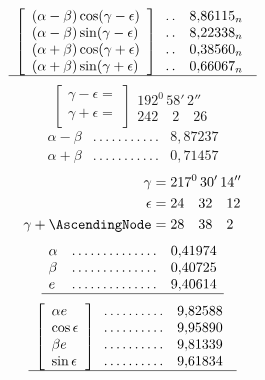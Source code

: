 \[
\begin{array}{c}
\left[\begin{array}{l}
(\alpha-\beta)\cos(\gamma-\epsilon)\\
(\alpha-\beta)\sin(\gamma-\epsilon)\\
(\alpha+\beta)\cos(\gamma+\epsilon)\\
(\alpha+\beta)\sin(\gamma+\epsilon)
\end{array}\right]
\begin{array}{cl}
.\,.&8{,}86115_n\\.\,.&8{,}22338_n\\.\,.&0{,}38560_n\\.\,.&0{,}66067_n
\end{array}\\
\hline
\end{array}
\]
\[
\left[\begin{array}{l}\gamma-\epsilon=\\\gamma+\epsilon=\end{array}\right]
\begin{array}{l}192^0\,58'\,2''\\242\quad2\quad26\end{array}
\]
\[
\begin{array}{lcl}
\alpha-\beta&.\,.\,.\,.\,.\,.\,.\,.\,.\,.\,.&8{,}87237\\
\alpha+\beta&.\,.\,.\,.\,.\,.\,.\,.\,.\,.\,.&0{,}71457
\end{array}
\]
\[
\begin{aligned}
\gamma&=217^0\,30'\,14''\\
\epsilon&=24\quad32\quad12\\
\gamma+\AscendingNode&=28\quad38\quad2
\end{aligned}
\]
\[
\begin{array}{lcl}
\alpha&.\,.\,.\,.\,.\,.\,.\,.\,.\,.\,.\,.\,.\,.&0{,}41974\\
\beta&.\,.\,.\,.\,.\,.\,.\,.\,.\,.\,.\,.\,.\,.&0{,}40725\\
e&.\,.\,.\,.\,.\,.\,.\,.\,.\,.\,.\,.\,.\,.&9{,}40614\\
\hline
\end{array}
\]
\[
\begin{array}{c}
\left[\begin{array}{l}
\alpha e\\\cos\epsilon\\\beta e\\\sin\epsilon
\end{array}\right]
\begin{array}{cl}
.\,.\,.\,.\,.\,.\,.\,.\,.\,.&9{,}82588\\
.\,.\,.\,.\,.\,.\,.\,.\,.\,.&9{,}95890\\
.\,.\,.\,.\,.\,.\,.\,.\,.\,.&9{,}81339\\
.\,.\,.\,.\,.\,.\,.\,.\,.\,.&9{,}61834
\end{array}\\
\hline
\end{array}
\]
